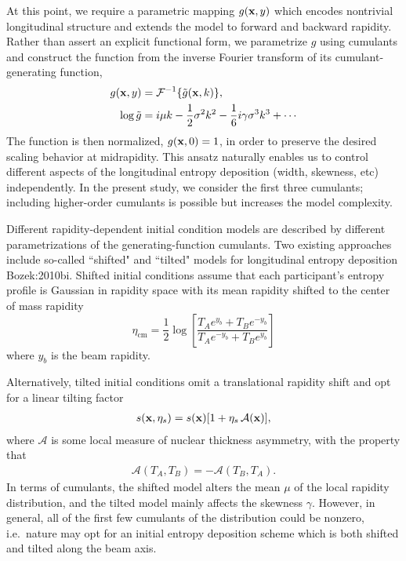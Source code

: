 At this point, we require a parametric mapping $g(\mathbf x, y)$ which encodes nontrivial longitudinal structure and extends the model to forward and backward rapidity.
Rather than assert an explicit functional form, we parametrize $g$ using cumulants and construct the function from the inverse Fourier transform of its cumulant-generating function,
\begin{align}
  g(\mathbf x, y) &= \mathcal{F}^{-1}\{\tilde{g}(\mathbf x, k)\}, \label{gfunc} \\
  \log \tilde{g} &=  i \mu k - \frac{1}{2}\sigma^2 k^2 - \frac{1}{6} i \gamma \sigma^3 k^3 + \cdots \label{cgf}
\end{align}
The function is then normalized, $g(\mathbf x, 0)=1$, in order to preserve the desired scaling behavior at midrapidity.
This ansatz naturally enables us to control different aspects of the longitudinal entropy deposition (width, skewness, etc) independently.
In the present study, we consider the first three cumulants; including higher-order cumulants is possible but increases the model complexity.

Different rapidity-dependent initial condition models are described by different parametrizations of the generating-function cumulants.
Two existing approaches include so-called ``shifted" and ``tilted" models for longitudinal entropy deposition {Bozek:2010bi}.
Shifted initial conditions assume that each participant's entropy profile is Gaussian in rapidity space with its mean rapidity shifted to the center of mass rapidity
\begin{equation}
  \eta_\text{cm}=\frac{1}{2} \log \left[\frac{T_A e^{y_b}+T_Be^{-y_b}}{T_A e^{-y_b}+T_B e^{y_b}}\right]
\end{equation}
where $y_b$ is the beam rapidity.

Alternatively, tilted initial conditions omit a translational rapidity shift and opt for a linear tilting factor
\begin{align}
  s(\mathbf x, \eta_s) = s(\mathbf x) [1+\eta_s\, \mathcal{A}(\mathbf x)],
\end{align}
where $\mathcal{A}$ is some local measure of nuclear thickness asymmetry, with the property that
\begin{align}\label{asym}
  \mathcal{A}(T_A, T_B) = -\mathcal{A}(T_B, T_A).
\end{align}
In terms of cumulants, the shifted model alters the mean $\mu$ of the local rapidity distribution, and the tilted model mainly affects the skewness $\gamma$.
However, in general, all of the first few cumulants of the distribution could be nonzero, i.e.\ nature may opt for an initial entropy deposition scheme which is both shifted and tilted along the beam axis.

